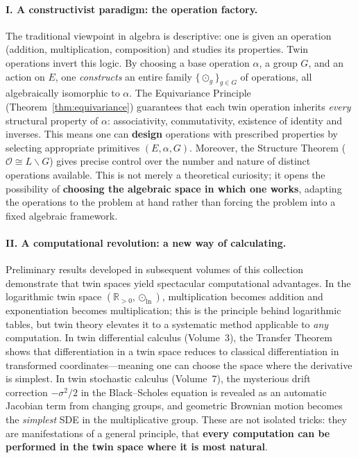 \documentclass[11pt,a4paper,openany]{book}
\theoremstyle{plain}
\theoremstyle{definition}
\newcommand{\twing}[1]{\odot_{#1}}
\newcommand{\opspace}{\mathcal{O}}
\newcommand{\lingroup}{L}
\newcommand{\actspace}{E}
\newcommand{\groupG}{G}
\begin{document}
\paragraph{I. A constructivist paradigm: the operation factory.} The traditional viewpoint in algebra is descriptive: one is given an operation (addition, multiplication, composition) and studies its properties. Twin operations invert this logic. By choosing a base operation $\alpha$, a group $\groupG$, and an action on $\actspace$, one \emph{constructs} an entire family $\{\twing{g}\}_{g \in \groupG}$ of operations, all algebraically isomorphic to $\alpha$. The Equivariance Principle (Theorem~\ref{thm:equivariance}) guarantees that each twin operation inherits \emph{every} structural property of $\alpha$: associativity, commutativity, existence of identity and inverses. This means one can \textbf{design} operations with prescribed properties by selecting appropriate primitives $(\actspace, \alpha, \groupG)$. Moreover, the Structure Theorem ($\opspace \cong \lingroup\backslash\groupG$) gives precise control over the number and nature of distinct operations available. This is not merely a theoretical curiosity; it opens the possibility of \textbf{choosing the algebraic space in which one works}, adapting the operations to the problem at hand rather than forcing the problem into a fixed algebraic framework.

\paragraph{II. A computational revolution: a new way of calculating.} Preliminary results developed in subsequent volumes of this collection demonstrate that twin spaces yield spectacular computational advantages. In the logarithmic twin space $(\mathbb{R}_{>0}, \twing{\ln})$, multiplication becomes addition and exponentiation becomes multiplication; this is the principle behind logarithmic tables, but twin theory elevates it to a systematic method applicable to \emph{any} computation. In twin differential calculus (Volume~3), the Transfer Theorem shows that differentiation in a twin space reduces to classical differentiation in transformed coordinates---meaning one can choose the space where the derivative is simplest. In twin stochastic calculus (Volume~7), the mysterious drift correction $-\sigma^2/2$ in the Black--Scholes equation is revealed as an automatic Jacobian term from changing groups, and geometric Brownian motion becomes the \emph{simplest} SDE in the multiplicative group. These are not isolated tricks: they are manifestations of a general principle, that \textbf{every computation can be performed in the twin space where it is most natural}.
\end{document}
